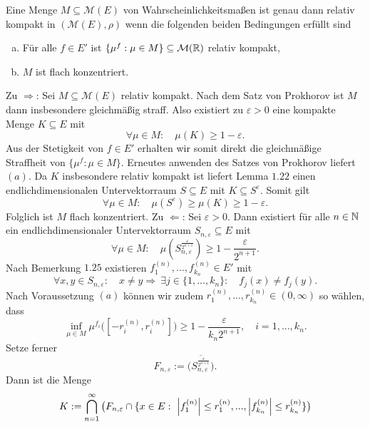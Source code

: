\begin{theorem}
    Eine Menge $M \subseteq \mathcal{M}(E)$ von Wahrscheinlichkeitsmaßen ist genau dann relativ kompakt in $(\mathcal{M}(E), \rho)$ wenn die folgenden beiden Bedingungen erfüllt sind
    \begin{enumerate}[(a)]
        \item Für alle $f \in E'$ ist $\{\mu^f : \mu \in M\} \subseteq \mathcal{M}(\mathbb{R})$ relativ kompakt,
        \item $M$ ist flach konzentriert. 
    \end{enumerate}
\end{theorem}

\begin{proof*}
    Zu $\Rightarrow$: 
    Sei $M \subseteq \mathcal{M}(E)$ relativ kompakt. Nach dem Satz von Prokhorov ist $M$ dann insbesondere gleichmäßig straff. 
    Also existiert zu $\varepsilon > 0$ eine kompakte Menge $K \subseteq E$ mit 
    $$
        \forall \mu \in M: \quad \mu(K) \geq 1 - \varepsilon.   
    $$ 
    Aus der Stetigkeit von $f \in E'$ erhalten wir somit direkt die gleichmäßige Straffheit von \mbox{$\{\mu^f : \mu \in M\}$}. Erneutes anwenden des Satzes von Prokhorov liefert $(a)$. 
    Da $K$ insbesondere relativ kompakt ist liefert Lemma $1.22$ einen endlichdimensionalen Untervektorraum $S \subseteq E$ mit $K \subseteq S^{\varepsilon}$. Somit gilt
    $$
        \forall \mu \in M: \quad \mu(S^{\varepsilon}) \geq \mu(K) \geq 1 - \varepsilon.
    $$
    Folglich ist $M$ flach konzentriert. 
    \newline 
    Zu $\Leftarrow$: 
    Sei $\varepsilon > 0$. Dann existiert für alle $n \in \mathbb{N}$ ein endlichdimensionaler Untervektorraum $S_{n, \varepsilon} \subseteq E$ mit 
    $$
        \forall \mu \in M: \quad \mu(S_{n, \varepsilon}^{\frac{\varepsilon}{2^{n+1}}}) \geq 1 - \frac{\varepsilon}{2^{n+1}}.
    $$
    Nach Bemerkung $1.25$ existieren $f_1^{(n)},...,f_{k_n}^{(n)} \in E'$ mit 
    $$
        \forall x,y \in S_{n, \varepsilon}: \quad x \neq y \Rightarrow \ \exists j \in \{1,...,k_n\}: \quad f_j(x) \neq f_j(y). 
    $$
    Nach Voraussetzung $(a)$ können wir zudem $r_1^{(n)},...,r_{k_n}^{(n)} \in (0, \infty)$ so wählen, dass
    $$
        \inf_{\mu \in M} \mu^{f_i}\big([-r_i^{(n)}, r_i^{(n)}]\big) \geq 1 - \frac{\varepsilon}{k_n 2^{n+1}}, \quad i=1,...,k_n.
    $$
    Setze ferner
    $$
        F_{n,\varepsilon} := \overline{\big(S_{n,\varepsilon}^{\frac{\varepsilon}{2^{n+1}}}\big)}.
    $$
    Dann ist die Menge 
    $$
        K := \bigcap_{n =1}^{\infty}\big(F_{n, \varepsilon} \cap\{x \in E: \ \left| f_1^{(n)} \right|\leq r_1^{(n)},...,\left| f_{k_n}^{(n)} \right|\leq r_{k_n}^{(n)}\}\big)
$$
\end{proof*}
